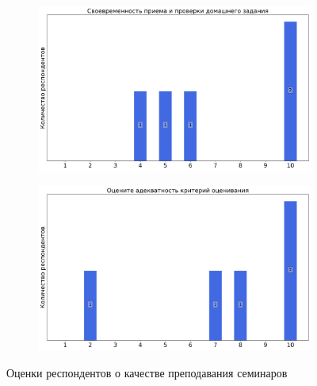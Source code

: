 \begin{figure}[H]
\begin{subfigure}[b]{0.45\textwidth}
                \includegraphics[width=\textwidth]{images/1 course/Дискретный анализ/seminarists-marks-Кириков Е.-2.png}
            \end{subfigure}
            \begin{subfigure}[b]{0.45\textwidth}
                \centering
                \includegraphics[width=\textwidth]{images/1 course/Дискретный анализ/seminarists-marks-Кириков Е.-3.png}
            \end{subfigure}	
            \caption{Оценки респондентов о качестве преподавания семинаров}
        \end{figure}

